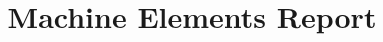 \documentclass{presets}
\begin{document}
	\title{Machine Elements Report}
	\maketitle\newpage
	\tableofcontents
	\listoftables
	\listoffigures
	
	
%	
%	
\end{document}
